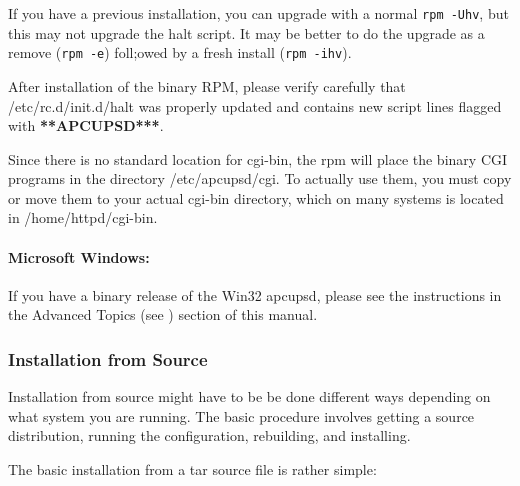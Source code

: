 If you have a previous installation, you can upgrade with a normal {\tt rpm
-Uhv}, but this may not upgrade the halt script. It may be better to do the
upgrade as a remove ({\tt rpm -e}) foll;owed by a fresh install ({\tt rpm
-ihv}).  

After installation of the binary RPM, please verify carefully that
/etc/rc.d/init.d/halt was properly updated and contains new script lines
flagged with {\bf ***APCUPSD***}.  

Since there is no standard location for cgi-bin, the rpm will place the binary
CGI programs in the directory /etc/apcupsd/cgi. To actually use them, you must
copy or move them to your actual cgi-bin directory, which on many systems is
located in /home/httpd/cgi-bin. 

\label{Microsoft-Windows}

\paragraph*{Microsoft Windows:}

\label{index-Installing_002c-Microsoft-21}
If you have a binary release of the Win32 apcupsd, please see the instructions
in the Advanced Topics (see 
) section of this manual. 

\label{Installation-from-Source}

\subsubsection*{Installation from Source}

Installation from source might have to be be done different ways depending on
what system you are running. The basic procedure involves getting a source
distribution, running the configuration, rebuilding, and installing.  

The basic installation from a tar source file is rather simple:  

